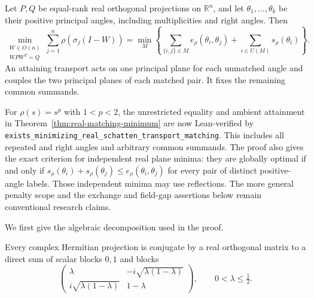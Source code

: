 \begin{theorem}
\label{thm:real-matching-minimum}
Let $P,Q$ be equal-rank real orthogonal projections on $\mathbb R^n$,
and let $\theta_1,\ldots,\theta_k$ be their positive principal angles,
including multiplicities and right angles. Then
\begin{equation}
 \min_{\substack{W\in O(n)\\WPW^T=Q}}
   \sum_{j=1}^n\rho(\sigma_j(I-W))
 =\min_M\left\{
    \sum_{\{i,j\}\in M}e_\rho(\theta_i,\theta_j)
     +\sum_{i\in U(M)}s_\rho(\theta_i)\right\}.
 \label{eq:real-matching-minimum}
\end{equation}
An attaining transport acts on one principal plane for each unmatched
angle and couples the two principal planes of each matched pair.
It fixes the remaining common summands.
\end{theorem}

For $\rho(s)=s^p$ with $1<p<2$, the unrestricted equality and ambient
attainment in Theorem~\ref{thm:real-matching-minimum} are now Lean-verified
by \texttt{exists\_minimizing\_real\_schatten\_transport\_matching}.
This includes all repeated and right angles and arbitrary common summands.
The proof also gives the exact criterion for independent real plane minima:
they are globally optimal if and only if
$s_\rho(\theta_i)+s_\rho(\theta_j)\le e_\rho(\theta_i,\theta_j)$
for every pair of distinct positive-angle labels. Those independent minima
may use reflections. The more general penalty scope and the exchange and
field-gap assertions below remain conventional research claims.

We first give the algebraic decomposition used in the proof.

\begin{lemma}
\label{lem:hermitian-projection-real-blocks}
Every complex Hermitian projection is conjugate by a real orthogonal
matrix to a direct sum of scalar blocks $0,1$ and blocks
\[
 \begin{pmatrix}
   \lambda&-i\sqrt{\lambda(1-\lambda)}\\
   i\sqrt{\lambda(1-\lambda)}&1-\lambda
 \end{pmatrix},\qquad 0<\lambda\leq\tfrac12.
\]
\end{lemma}

